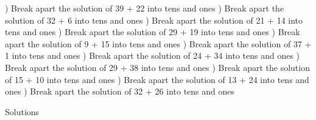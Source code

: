 \documentclass{article}%
\begin{document}
\newline%
) Break apart the solution of 39 + 22 into tens and ones%
\newline%
\newline%
) Break apart the solution of 32 + 6 into tens and ones%
\newline%
\newline%
) Break apart the solution of 21 + 14 into tens and ones%
\newline%
\newline%
) Break apart the solution of 29 + 19 into tens and ones%
\newline%
\newline%
) Break apart the solution of 9 + 15 into tens and ones%
\newline%
\newline%
) Break apart the solution of 37 + 1 into tens and ones%
\newline%
\newline%
) Break apart the solution of 24 + 34 into tens and ones%
\newline%
\newline%
) Break apart the solution of 29 + 38 into tens and ones%
\newline%
\newline%
) Break apart the solution of 15 + 10 into tens and ones%
\newline%
\newline%
) Break apart the solution of 13 + 24 into tens and ones%
\newline%
\newline%
) Break apart the solution of 32 + 26 into tens and ones%
\newline%
\newline%
\newline%
\pagebreak%
\huge%
\vspace*{\fill}%
\begin{center}%
Solutions%
\end{center}%
\end{document}
